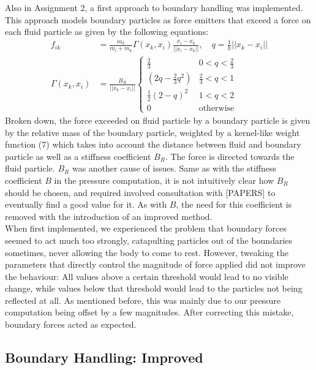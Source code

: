 \documentclass{ACGSeminar}
\begin{document}
Also in Assignment 2, a first approach to boundary handling was implemented. This approach models boundary particles as force emitters that exceed a force on each fluid particle as given by the following equations:\\
\begin{equation}
\begin{aligned}
f_{ik} &= \frac{m_k}{m_i + m_k} \Gamma(x_k, x_i) \frac{x_i - x_k}{||x_i - x_k||}, \quad q = \frac{1}{h}||x_k - x_i|| \\
\Gamma (x_k, x_i) &= \frac{B_R}{||x_k - x_i||} 
\begin{cases}
\frac{2}{3}  & 0 < q < \frac{2}{3} \\
(2q - \frac{2}{3} q^2)  & \frac{2}{3} < q < 1 \\
\frac{1}{2}(2-q)^2 & 1<q<2 \\
0 & \text{otherwise}
\end{cases}
\end{aligned}
\end{equation}
Broken down, the force exceeded on fluid particle by a boundary particle is given by the relative mass of the boundary particle, weighted by a kernel-like weight function (7) which takes into account the distance between fluid and boundary particle as well as a stiffness coefficient \(B_R\). The force is directed towards the fluid particle.
\(B_R\) was another cause of issues. Same as with the stiffness coefficient \(B\) in the pressure computation, it is not intuitively clear how \(B_R\) should be chosen, and required involved consultation with [PAPERS] to eventually find a good value for it. As with \(B\), the need for this coefficient is removed with the introduction of an improved method. \\
When first implemented, we experienced the problem that boundary forces seemed to act much too strongly, catapulting particles out of the boundaries sometimes, never allowing the body to come to rest.
However, tweaking the parameters that directly control the magnitude of force applied did not improve the behaviour: All values above a certain threshold would lead to no visible change, while values below that threshold would lead to the particles not being reflected at all.
As mentioned before, this was mainly due to our pressure computation being offset by a few magnitudes. After correcting this mistake, boundary forces acted as expected.

\subsection{Boundary Handling: Improved}
\end{document}
